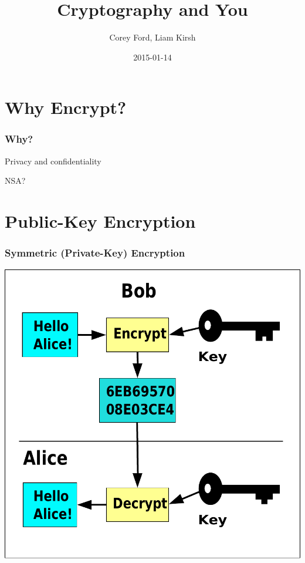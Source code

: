 \documentclass{beamer}
\title{Cryptography and You}
\author{Corey Ford, Liam Kirsh}
\institute{The White Hat}
\date{2015-01-14}
\begin{document}
\frame{\titlepage}

\section{Why Encrypt?}

\begin{frame}
  \frametitle{Why?}

Privacy and confidentiality

NSA?

\end{frame}

\section{Public-Key Encryption}

\begin{frame}
  \frametitle{Symmetric (Private-Key) Encryption}

\includegraphics[height=0.5\textheight]{Symmetric_encryption}

\end{frame}
\end{document}
